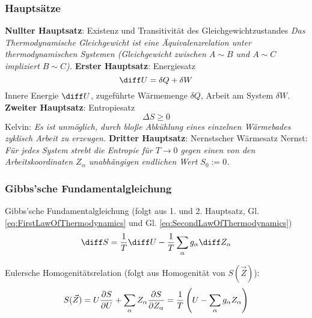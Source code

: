 \documentclass[11pt]{article}
\numberwithin{equation}{section}
\begin{document}
      \subsubsection{Hauptsätze}
        \textbf{Nullter Hauptsatz}: Existenz und Transitivität des Gleichgewichtzustandes\newline
          \indent \emph{Das Thermodynamische Gleichgewicht ist eine Äquivalenzrelation unter thermodynamischen Systemen (Gleichgewicht zwischen $A \sim B$ und $A \sim C$ impliziert $ B \sim C$).} \nl
        \textbf{Erster Hauptsatz}: Energiesatz
          \begin{equation}
            \label{eq:FirstLawOfThermodynamics}
            \diff U = \delta Q + \delta W
          \end{equation}
          \indent Innere Energie $\diff U$, zugeführte Wärmemenge $\delta Q$, Arbeit am System $\delta W$. \nl
        \textbf{Zweiter Hauptsatz}: Entropiesatz
          \begin{equation}
            \label{eq:SecondLawOfThermodynamics}
            \Delta S  \ge 0
          \end{equation}
          \indent Kelvin: \emph{Es ist unmöglich, durch bloße Abkühlung eines einzelnen Wärmebades zyklisch Arbeit zu erzeugen. }\nl
        \textbf{Dritter Hauptsatz}: Nernstscher Wärmesatz\newline
          \indent Nernst: \emph{Für jedes System strebt die Entropie für $T \rightarrow 0$ gegen einen von den Arbeitskoordinaten $Z_\alpha$ unabhängigen endlichen Wert $S_0:=0$.}

      \subsubsection{Gibbs'sche Fundamentalgleichung}
        Gibbs'sche Fundamentalgleichung (folgt aus 1. und 2. Hauptsatz, Gl. \ref{eq:FirstLawOfThermodynamics} und Gl. \ref{eq:SecondLawOfThermodynamics})
        \begin{equation}
          \label{eq:GibbsFundamental}
          \diff S = \frac{1}{T} \diff U - \frac{1}{T} \sum_{\alpha} g_\alpha \diff Z_\alpha
        \end{equation}

        Eulersche Homogenitätsrelation (folgt aus Homogenität von $S(\vec{Z})$):
        \begin{equation}
          \label{eq:EulerHomogenity}
          S(\vec{Z}) = U\frac{\partial S}{\partial U} + \sum_\alpha Z_\alpha\frac{\partial S}{\partial Z_\alpha}
          = \frac{1}{T} \left( U-\sum_\alpha g_\alpha Z_\alpha \right)
        \end{equation}
\end{document}
